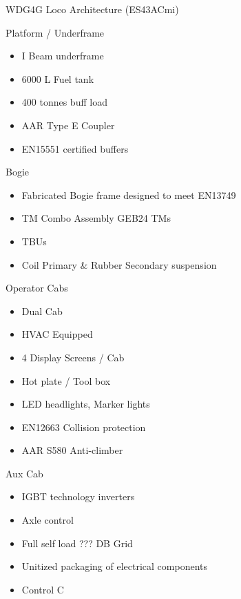 \documentclass[
  ignorenonframetext,
]{beamer}
\providecommand{\tightlist}{%
  \setlength{\itemsep}{0pt}\setlength{\parskip}{0pt}}
\begin{document}
\begin{frame}{WDG4G Loco Architecture (ES43ACmi)}
\protect\hypertarget{wdg4g-loco-architecture-es43acmi}{}
\begin{block}{Platform / Underframe}
\protect\hypertarget{platform-underframe}{}
\begin{itemize}[<+->]
\tightlist
\item
  I Beam underframe
\item
  6000 L Fuel tank
\item
  400 tonnes buff load
\item
  AAR Type E Coupler
\item
  EN15551 certified buffers
\end{itemize}
\end{block}

\begin{block}{Bogie}
\protect\hypertarget{bogie}{}
\begin{itemize}[<+->]
\tightlist
\item
  Fabricated Bogie frame designed to meet EN13749
\item
  TM Combo Assembly GEB24 TMs
\item
  TBUs
\item
  Coil Primary \& Rubber Secondary suspension
\end{itemize}
\end{block}

\begin{block}{Operator Cabs}
\protect\hypertarget{operator-cabs}{}
\begin{itemize}[<+->]
\tightlist
\item
  Dual Cab
\item
  HVAC Equipped
\item
  4 Display Screens / Cab
\item
  Hot plate / Tool box
\item
  LED headlights, Marker lights
\item
  EN12663 Collision protection
\item
  AAR S580 Anti-climber
\end{itemize}
\end{block}

\begin{block}{Aux Cab}
\protect\hypertarget{aux-cab}{}
\begin{itemize}[<+->]
\tightlist
\item
  IGBT technology inverters
\item
  Axle control
\item
  Full self load ??? DB Grid
\item
  Unitized packaging of electrical components
\item
  Control C
\end{itemize}
\end{block}


\end{frame}
\end{document}
